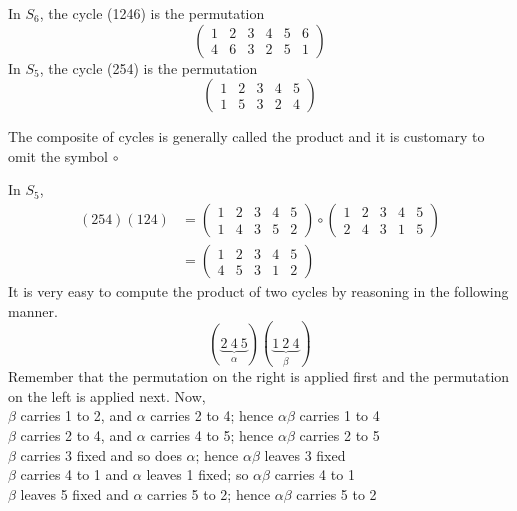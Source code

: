 \documentclass[12pt]{article}
\begin{document}
\begin{example} In $S_6$, the cycle (1246) is the permutation $$\begin{pmatrix} 1 & 2 & 3 & 4 & 5 & 6 \\ 4 & 6 & 3 & 2 & 5 & 1 \end{pmatrix} $$ In $S_5$, the cycle (254) is the permutation $$\begin{pmatrix} 1 & 2 & 3 & 4 & 5 \\ 1 & 5 & 3 & 2 & 4 \end{pmatrix} $$ \end{example} 

\begin{definition} The composite of cycles is generally called the product and it is customary to omit the symbol $\circ$ \end{definition} 

\begin{example} In $S_5$, $$\begin{aligned} (254)(124) &= \begin{pmatrix} 1 & 2 & 3 & 4 & 5 \\ 1 & 4 & 3 & 5 & 2 \end{pmatrix} \circ \begin{pmatrix} 1 & 2 & 3 & 4 & 5 \\ 2 & 4 & 3 & 1 & 5 \end{pmatrix} \\ &= \begin{pmatrix} 1 & 2 & 3 & 4 & 5 \\ 4 & 5 & 3 & 1 & 2 \end{pmatrix} \end{aligned} $$ It is very easy to compute the product of two cycles by reasoning in the following manner.$$ (\underbrace{2 ~ 4 ~ 5}_{\alpha})(\underbrace{1 ~ 2 ~ 4}_{\beta}) $$ 
Remember that the permutation on the right is applied first and the permutation on the left is applied next. Now, \\ $\beta$ carries 1 to 2, and $\alpha$ carries 2 to 4; hence $\alpha\beta$ carries 1 to 4 \\ $\beta$ carries 2 to 4, and $\alpha$ carries 4 to 5; hence $\alpha\beta$ carries 2 to 5 \\ $\beta$ carries 3 fixed and so does $\alpha$; hence $\alpha\beta$ leaves 3 fixed \\ $\beta$ carries 4 to 1 and $\alpha$ leaves 1 fixed; so $\alpha\beta$ carries 4 to 1 \\ $\beta$ leaves 5 fixed and $\alpha$ carries 5 to 2; hence $\alpha\beta$ carries 5 to 2 \end{example} 
\end{document}
